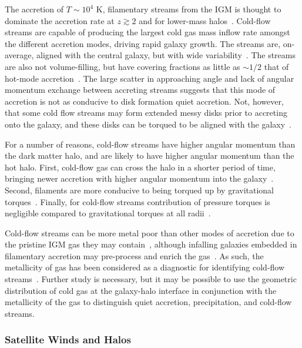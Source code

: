 \documentclass[fleqn,usenatbib]{mnras}
\begin{document}
The accretion of $T\sim 10^4$ K, filamentary streams from the IGM is thought to dominate the accretion rate at $z\gtrsim 2$ and for lower-mass halos~\citep[e.g.][]{Keres2005, Keres2009, Dekel2006, Oser2010, VanDeVoort2011a}.
Cold-flow streams are capable of producing the largest cold gas mass inflow rate amongst the different accretion modes, driving rapid galaxy growth.
The streams are, on-average, aligned with the central galaxy, but with wide variability~\citep[e.g.][]{Danovich2012, Stewart2011a, Stewart2013, Stewart2017}.
The streams are also not volume-filling, but have covering fractions as little as $\sim 1/2$ that of hot-mode accretion~\citep[e.g.][]{Wright2021}.
The large scatter in approaching angle and lack of angular momentum exchange between accreting streams suggests that this mode of accretion is not as conducive to disk formation quiet accretion.
Not, however, that some cold flow streams may form extended messy disks prior to accreting onto the galaxy, and these disks can be torqued to be aligned with the galaxy~\cite{Danovich2012, Danovich2015}.

For a number of reasons, cold-flow streams have higher angular momentum than the dark matter halo, and are likely to have higher angular momentum than the hot halo.
First, cold-flow gas can cross the halo in a shorter period of time, bringing newer accretion with higher angular momentum into the galaxy~\citep[e.g.][]{Stewart2013}.
Second, filaments are more conducive to being torqued up by gravitational torques~\citep[e.g.][]{Stewart2013, Danovich2015}.
Finally, for cold-flow streams contribution of pressure torques is negligible compared to gravitational torques at all radii~\citep[e.g.][]{Danovich2015}.

Cold-flow streams can be more metal poor than other modes of accretion due to the pristine IGM gas they may contain~\citep[e.g.][]{Hafen2019, Wright2021}, although infalling galaxies embedded in filamentary accretion may pre-process and enrich the gas~\citep[e.g.][]{Hafen2019}.
As such, the metallicity of gas has been considered as a diagnostic for identifying cold-flow streams~\citep[e.g.][]{Hafen2016}.
Further study is necessary, but it may be possible to use the geometric distribution of cold gas at the galaxy-halo interface in conjunction with the metallicity of the gas to distinguish quiet accretion, precipitation, and cold-flow streams.

\subsubsection{Satellite Winds and Halos}
\label{s: modes -- satellite}
\end{document}
